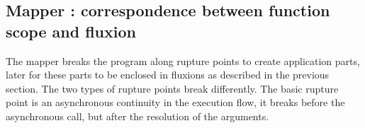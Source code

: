 \subsection{Mapper : correspondence between function scope and fluxion}










The mapper breaks the program along rupture points to create application parts, later for these parts to be enclosed in fluxions as described in the previous section.
The two types of rupture points break differently.
The basic rupture point is an asynchronous continuity in the execution flow, it breaks before the asynchronous call, but after the resolution of the arguments.

